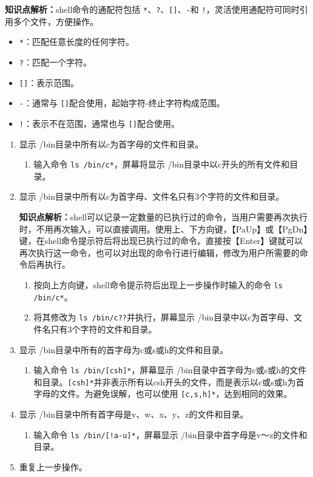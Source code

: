 \textbf{知识点解析：}shell命令的通配符包括 \verb|*|、\verb|?|、\verb|[]|、\verb|-|和 \verb|!|，灵活使用通配符可同时引用多个文件，方便操作。
\begin{itemize}
  \item \verb|*|：匹配任意长度的任何字符。
  \item \verb|?|：匹配一个字符。
  \item \verb|[]|：表示范围。
  \item \verb|-|：通常与 \verb|[]|配合使用，起始字符-终止字符构成范围。
  \item \verb|!|：表示不在范围，通常也与 \verb|[]|配合使用。
\end{itemize}
\begin{enumerate}
  \item 显示 /bin目录中所有以c为首字母的文件和目录。
    \begin{enumerate}
      \item 输入命令 \verb|ls /bin/c*|，屏幕将显示 /bin目录中以c开头的所有文件和目录。
    \end{enumerate}
  \item 显示 /bin目录中所有以c为首字母、文件名只有3个字符的文件和目录。

    \textbf{知识点解析：}shell可以记录一定数量的已执行过的命令，当用户需要再次执行时，不用再次输入，可以直接调用。使用上、下方向键，【PaUp】或【PgDn】键，在shell命令提示符后将出现已执行过的命令。直接按【Enter】键就可以再次执行这一命令，也可以对出现的命令行进行编辑，修改为用户所需要的命令后再执行。
    \begin{enumerate}
      \item 按向上方向键，shell命令提示符后出现上一步操作时输入的命令 \verb|ls /bin/c*|。
      \item 将其修改为 \verb|ls /bin/c??|并执行，屏幕显示 /bin目录中以c为首字母、文件名只有3个字符的文件和目录。
    \end{enumerate}
  \item 显示 /bin目录中所有的首字母为c或s或h的文件和目录。
    \begin{enumerate}
      \item 输入命令 \verb|ls /bin/[csh]*|，屏幕显示 /bin目录中首字母为c或s或h的文件和目录。\verb|[csh]*|并非表示所有以csh开头的文件，而是表示以c或s或h为首字母的文件。为避免误解，也可以使用 \verb|[c,s,h]*|，达到相同的效果。
    \end{enumerate}
  \item 显示 /bin目录中所有首字母是v、w、x、y、z的文件和目录。
    \begin{enumerate}
      \item 输入命令 \verb|ls /bin/[!a-u]*|，屏幕显示 /bin目录中首字母是v～z的文件和目录。
    \end{enumerate}
  \item 重复上一步操作。
    

\end{enumerate}
